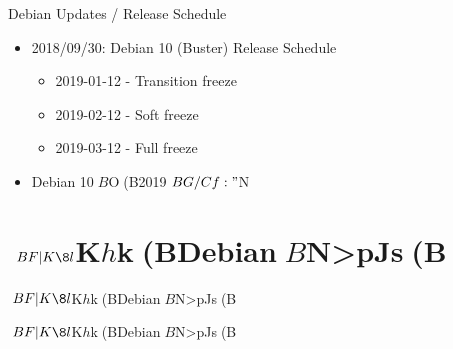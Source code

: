 \begin{frame}{Debian Updates / Release Schedule}%

\begin{itemize}
\item 2018/09/30:  Debian 10 (Buster) Release Schedule
  \begin{itemize}
  \item 2019-01-12 - Transition freeze
  \item 2019-02-12 - Soft freeze
  \item 2019-03-12 - Full freeze
  \end{itemize}
\item Debian 10$B$O(B2019$BG/Cf:"$N%

\end{itemize}

\end{frame}


\section{$BF|K\8l$K$h$k(BDebian$B$N>pJs(B}

\begin{frame}\begin{center}\Huge{$BF|K\8l$K$h$k(BDebian$B$N>pJs(B}\end{center}\end{frame}

\begin{frame}{$BF|K\8l$K$h$k(BDebian$B$N>pJs(B}
\end{frame}

